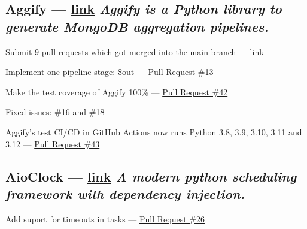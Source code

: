 \subsection{{Aggify --- \href{https://github.com/Aggify/aggify}{link} \hfill \textit{Aggify is a Python library to generate MongoDB aggregation pipelines.}}}
\begin{zitemize}
\item Submit 9 pull requests which got merged into the main branch --- \href{https://github.com/Aggify/aggify/pulls?q=is\%3Apr+is\%3Aclosed+author\%3Amahdihaghverdi}{link}
\item Implement one pipeline stage: {\ttfamily \$out} --- \href{https://github.com/Aggify/aggify/pull/13}{Pull Request \#13}
\item Make the test coverage of Aggify 100\% --- \href{https://github.com/Aggify/aggify/pull/42}{Pull Request \#42}
\item Fixed issues: \href{https://github.com/Aggify/aggify/pull/22}{\#16} and \href{https://github.com/Aggify/aggify/pull/21}{\#18}
\item Aggify's test CI/CD in GitHub Actions now runs Python 3.8, 3.9, 3.10, 3.11 and 3.12 --- \href{https://github.com/Aggify/aggify/pull/43}{Pull Request \#43}
\end{zitemize}
\subsection{{AioClock --- \href{https://github.com/ManiMozaffar/aioclock}{link} \hfill \textit{A modern python scheduling framework with dependency injection.}}}
\begin{zitemize}
\item Add suport for timeouts in tasks --- \href{https://github.com/ManiMozaffar/aioclock/pull/26}{Pull Request \#26}
\end{zitemize}
